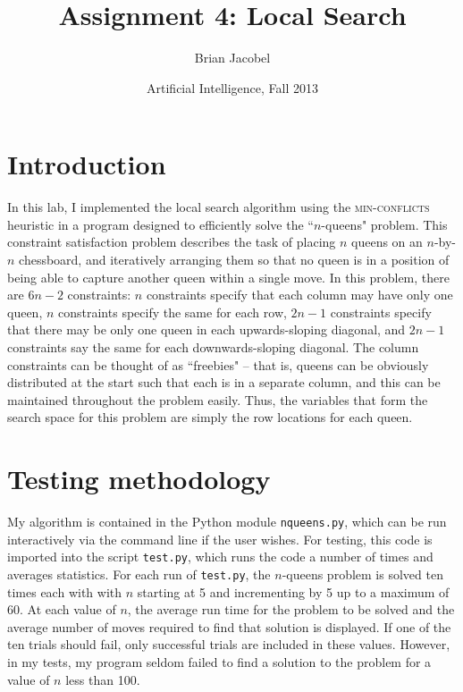 \documentclass{article}
\title{Assignment 4: Local Search}
\author{Brian Jacobel}
\date{Artificial Intelligence, Fall 2013}
\begin{document}
\maketitle

\begin{doublespace}

\section{Introduction}
In this lab, I implemented the local search algorithm using the \textsc{min-conflicts} heuristic in a program designed to efficiently solve the ``$n$-queens" problem. This constraint satisfaction problem describes the task of placing $n$ queens on an $n$-by-$n$ chessboard, and iteratively arranging them so that no queen is in a position of being able to capture another queen within a single move. In this problem, there are $6n-2$ constraints: $n$ constraints specify that each column may have only one queen, $n$ constraints specify the same for each row, $2n-1$ constraints specify that there may be only one queen in each upwards-sloping diagonal, and $2n-1$ constraints say the same for each downwards-sloping diagonal. The column constraints can be thought of as ``freebies" -- that is, queens can be obviously distributed at the start such that each is in a separate column, and this can be maintained throughout the problem easily. Thus, the variables that form the search space for this problem are simply the row locations for each queen.

\section{Testing methodology}
My algorithm is contained in the Python module \texttt{nqueens.py}, which can be run interactively via the command line if the user wishes. For testing, this code is imported into the script \texttt{test.py}, which runs the code a number of times and averages statistics. For each run of \texttt{test.py}, the $n$-queens problem is solved ten times each with with $n$ starting at 5 and incrementing by 5 up to a maximum of 60. At each value of $n$, the average run time for the problem to be solved and the average number of moves required to find that solution is displayed. If one of the ten trials should fail, only successful trials are included in these values. However, in my tests, my program seldom failed to find a solution to the problem for a value of $n$ less than 100. 


\end{doublespace}
\end{document}
